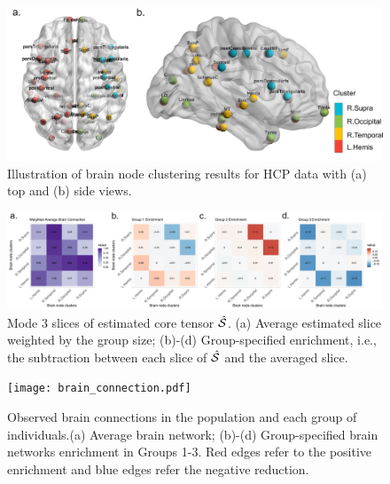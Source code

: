 \documentclass[lettersize,journal]{IEEEtran}
\theoremstyle{definition}
\theoremstyle{definition}
\begin{document}
\begin{figure}[htb]
    \centering
    \includegraphics[width = \columnwidth]{brain_node_cluster.pdf}
    \caption{Illustration of brain node clustering results for HCP data with (a) top and (b) side views. }
    \label{fig:cluster_brain}
\end{figure}

\begin{figure}[htb]
    \centering
    \includegraphics[width = 1\textwidth]{est_S_anno.pdf}
    \caption{Mode 3 slices of estimated core tensor $\hat {\mathcal{S}}$. (a) Average estimated slice weighted by the group size; (b)-(d) Group-specified enrichment, i.e., the subtraction between each slice of $\hat {\mathcal{S}}$ and the averaged slice. }
    \label{fig:ests}
\end{figure}

\begin{figure}[htb]
    \centering
    \texttt{[image: brain\_connection.pdf]}
    \caption{Observed brain connections in the population and each group of individuals.(a) Average brain network; (b)-(d) Group-specified brain networks enrichment in Groups 1-3. Red edges refer to the positive enrichment and blue edges refer the negative reduction.}
    \label{fig:brain_conn}
\end{figure}
\end{document}
